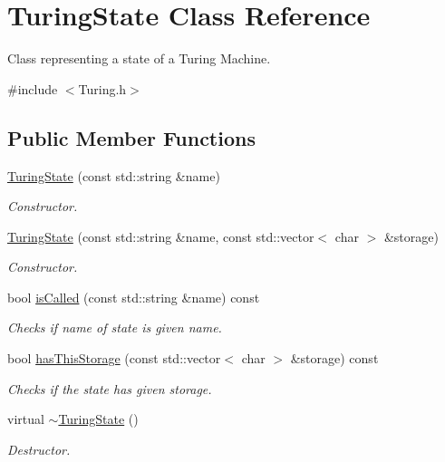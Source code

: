 \hypertarget{class_turing_state}{\section{Turing\-State Class Reference}
\label{class_turing_state}
}


Class representing a state of a Turing Machine.  




{\ttfamily \#include $<$Turing.\-h$>$}

\subsection*{Public Member Functions}
\begin{DoxyCompactItemize}
\item 
\hyperlink{class_turing_state_ab9c1f57a2f1c3c73ca46f0cfe245785b}{Turing\-State} (const std\-::string \&name)
\begin{DoxyCompactList}\small\item\em Constructor. \end{DoxyCompactList}\item 
\hyperlink{class_turing_state_a1232a3075d3ed7ad5a9c093df7adf28c}{Turing\-State} (const std\-::string \&name, const std\-::vector$<$ char $>$ \&storage)
\begin{DoxyCompactList}\small\item\em Constructor. \end{DoxyCompactList}\item 
bool \hyperlink{class_turing_state_ad8249c4371600e0dda6afe62abad9f06}{is\-Called} (const std\-::string \&name) const 
\begin{DoxyCompactList}\small\item\em Checks if name of state is given name. \end{DoxyCompactList}\item 
bool \hyperlink{class_turing_state_ac0a93af42bf76f2fac2fce09e288b974}{has\-This\-Storage} (const std\-::vector$<$ char $>$ \&storage) const 
\begin{DoxyCompactList}\small\item\em Checks if the state has given storage. \end{DoxyCompactList}\item 
\hypertarget{class_turing_state_ae5613f5e5d5e669ad1e56c772b1b8896}{virtual \hyperlink{class_turing_state_ae5613f5e5d5e669ad1e56c772b1b8896}{$\sim$\-Turing\-State} ()}\label{class_turing_state_ae5613f5e5d5e669ad1e56c772b1b8896}

\begin{DoxyCompactList}\small\item\em Destructor. \end{DoxyCompactList}\end{DoxyCompactItemize}
